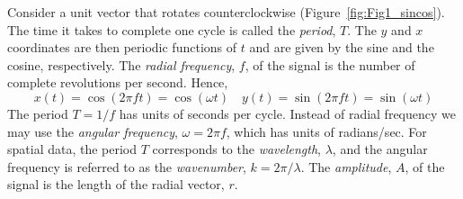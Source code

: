 Consider a unit vector that rotates counterclockwise (Figure~\ref{fig:Fig1_sincos}).  The time it takes to
complete one cycle is 
called the \emph{period}, $T$.  The $y$ and $x$ coordinates are then periodic functions of $t$ and are given by the 
sine and the cosine, respectively.  The \emph{radial frequency}, $f$, of the signal is the number of complete 
revolutions per second.  Hence,
\begin{equation}
x(t) = \cos (2 \pi ft) = \cos (\omega t) \quad y(t) = \sin (2\pi ft) = \sin (\omega t)
\end{equation}
The period $T = 1/f$ has units of seconds per cycle.  Instead of radial frequency we may use the \emph{angular 
frequency}, $\omega = 2 \pi f$, which has units of radians/sec.  For spatial data, the period $T$ corresponds to 
the \emph{wavelength}, $\lambda$, and the angular frequency is referred to as the \emph{wavenumber}, $k = 2\pi/\lambda$.
The \emph{amplitude}, $A$,
of the signal is the length of the radial vector, $r$.

